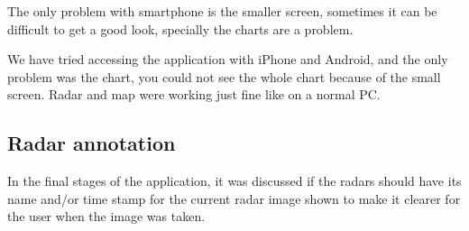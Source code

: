 The only problem with smartphone is the smaller screen, sometimes it can be difficult to get a good look, specially the charts are a problem.

We have tried accessing the application with iPhone and Android, and the only problem was the chart, you could not see the whole chart because of the small screen. Radar and map were working just fine like on a normal PC.

\subsection{Radar annotation}
\label{sec:radar_annotation}
In the final stages of the application, it was discussed if the radars should have its name and/or time stamp for the current radar image shown to make it clearer for the user when the image was taken.


